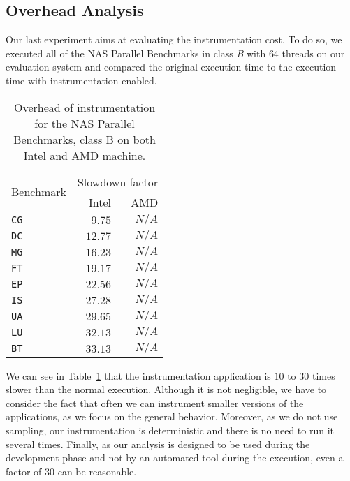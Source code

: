 \subsection{Overhead Analysis}
\label{sec:expe-overhead}

Our last experiment aims at evaluating the instrumentation cost. To do so, we
executed all of the NAS Parallel Benchmarks in class \emph{B} with $64$ threads on our evaluation system and compared
the original execution time to the execution time with instrumentation enabled.


\begin{table}
    \centering
    \begin{tabular}{lrr}
        \toprule
        \multirow{2}{*}{Benchmark} & \multicolumn{2}{c}{Slowdown factor} \\
        \cmidrule(lr){2-3}
        & Intel & AMD \\
        \midrule
        \texttt{CG}  &   $9.75 $ & $N/A$ \\
        \texttt{DC}  &   $12.77$ & $N/A$ \\
        \texttt{MG}  &   $16.23$ & $N/A$ \\
        \texttt{FT}  &   $19.17$ & $N/A$ \\
        \texttt{EP}  &   $22.56$ & $N/A$ \\
        \texttt{IS}  &   $27.28$ & $N/A$ \\
        \texttt{UA}  &   $29.65$ & $N/A$ \\
        \texttt{LU}  &   $32.13$ & $N/A$ \\
        \texttt{BT}  &   $33.13$ & $N/A$ \\
        \bottomrule
    \end{tabular}
    \caption{Overhead of \TABARNAC instrumentation for the NAS Parallel
    Benchmarks, class B on both Intel and AMD machine.}
    \label{tab:ovh}
\end{table}

We can see in Table~\ref{tab:ovh} that
the instrumentation application is $10$ to $30$ times slower than the normal execution. Although it is
not negligible, we have to consider the fact that often we can instrument
smaller versions of the applications, as we focus on the general behavior.
Moreover, as we do not use sampling, our instrumentation is deterministic and
there is no need to run it several times. Finally, as our
analysis is designed to be used during the development phase and not by an automated tool during the execution, even a factor of $30$
can be reasonable.


